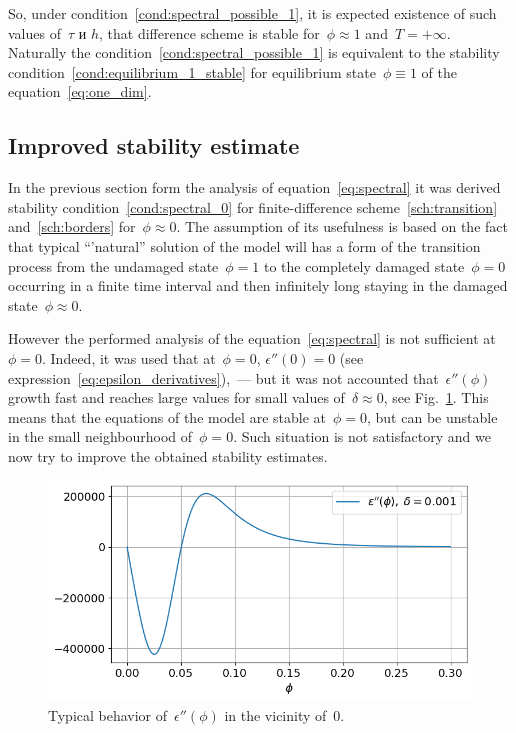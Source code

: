 So, under condition~\eqref{cond:spectral_possible_1}, it is expected
existence of such values of~$\tau$ и $h$,
that difference scheme is stable for~$\phi \approx 1$
and~$T=+\infty$.
Naturally the condition~\eqref{cond:spectral_possible_1}
is equivalent to the stability condition~\eqref{cond:equilibrium_1_stable}
for equilibrium state~$\phi \equiv 1$ of the equation~\eqref{eq:one_dim}.

\subsection{Improved stability estimate}

In the previous section form the analysis of equation~\eqref{eq:spectral}
it was derived stability condition~\eqref{cond:spectral_0}
for finite-difference scheme~\eqref{sch:transition} and~\eqref{sch:borders} for~$\phi \approx 0$.
The assumption of its usefulness is based on the fact that typical ``'natural'' solution of the model
will has a form of the transition process from the undamaged state~$\phi=1$ to the completely
damaged state~$\phi=0$ occurring in a finite time interval and then infinitely long staying in the
damaged state~$\phi \approx 0$.


However the performed analysis of the equation~\eqref{eq:spectral}
is not sufficient at~$\phi = 0$. Indeed, it was used that at~$\phi=0$,
$\epsilon''(0) = 0$ (see expression~\eqref{eq:epsilon_derivatives}),~---
but it was not accounted that~$\epsilon''(\phi)$ growth fast and reaches
large values  for small values of~$\delta\approx 0$,
see Fig.~\ref{fig:eps_phi_phi}.
This means that the equations of the model are stable at~$\phi=0$,
but can be unstable in the small neighbourhood of~$\phi=0$.
Such situation is not satisfactory and we now try to improve
the obtained stability estimates.
%
\begin{figure}[!t]
	\centering
	\includegraphics[width=\textwidth]{figures/eps_phi_phi.png}
	\vspace{-0.7cm}
	\caption{Typical behavior of~$\epsilon''(\phi)$ in the vicinity of~$0$.}
	\label{fig:eps_phi_phi}
\end{figure}

